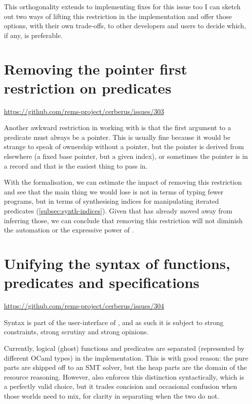 This orthogonality extends to implementing fixes for this issue too
\textemdash{} I can sketch out two ways of lifting this restriction in the
implementation and offer those options, with their own trade-offs, to other
developers and users to decide which, if any, is preferable.

\section{Removing the pointer first restriction on predicates}\label{sec:rm-ptr-first}
\url{https://github.com/rems-project/cerberus/issues/303}

Another awkward restriction in working with  is that the first argument
to a predicate must always be a pointer. This is usually fine because it would
be strange to speak of ownership without a pointer, but the pointer is derived
from elsewhere (a fixed base pointer, but a given index), or sometimes the
pointer is in a record and that is the easiest thing to pass in.

With the formalisation, we can estimate the impact of removing this restriction
and see that the main thing we would lose is not in terms of typing fewer
programs, but in terms of synthesising indices for manipulating iterated
predicates (\cref{subsec:synth-indices}). Given that  has already moved
away from inferring those, we can
conclude that removing this restriction will not diminish the automation or the
expressive power of .

\section{Unifying the syntax of functions, predicates and specifications}

\url{https://github.com/rems-project/cerberus/issues/304}

Syntax is part of the user-interface of , and as such it is subject to
strong constraints, strong scrutiny and strong opinions.

Currently, logical (ghost) functions and predicates are separated (represented
by different OCaml types) in the implementation. This is with good reason:
the pure parts are shipped off to an SMT solver, but the heap parts are the
domain of the resource reasoning. However,  also enforces this
distinction syntactically, which is a perfectly valid choice, but it trades
concision and occasional confusion when those worlds need to mix, for clarity
in separating when the two do not.

